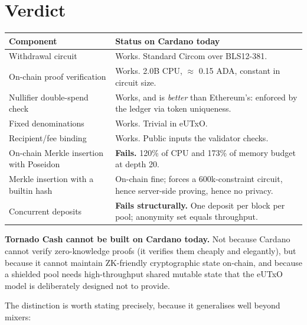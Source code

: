 \section{Verdict} \label{sec:ch8-verdict}

\begin{center}
\begin{tabular}{lp{6.9cm}}
  \hline
  \textbf{Component} & \textbf{Status on Cardano today} \\
  \hline
  Withdrawal circuit
    & Works. Standard Circom over BLS12-381. \\
  \addlinespace
  On-chain proof verification
    & Works. 2.0B CPU, $\approx$ 0.15 ADA, constant in circuit size. \\
  \addlinespace
  Nullifier double-spend check
    & Works, and is \emph{better} than Ethereum's: enforced by the ledger
      via token uniqueness. \\
  \addlinespace
  Fixed denominations
    & Works. Trivial in eUTxO. \\
  \addlinespace
  Recipient/fee binding
    & Works. Public inputs the validator checks. \\
  \hline
  \addlinespace
  On-chain Merkle insertion with Poseidon
    & \textbf{Fails.} 120\% of CPU and 173\% of memory budget at depth 20. \\
  \addlinespace
  Merkle insertion with a builtin hash
    & On-chain fine; forces a 600k-constraint circuit, hence server-side
      proving, hence no privacy. \\
  \addlinespace
  Concurrent deposits
    & \textbf{Fails structurally.} One deposit per block per pool; anonymity
      set equals throughput. \\
  \hline
\end{tabular}
\end{center}

\begin{highlight}
\textbf{Tornado Cash cannot be built on Cardano today.} Not because Cardano
cannot verify zero-knowledge proofs (it verifies them cheaply and elegantly),
but because it cannot maintain ZK-friendly cryptographic state on-chain, and
because a shielded pool needs high-throughput shared mutable state that the
eUTxO model is deliberately designed not to provide.
\end{highlight}

The distinction is worth stating precisely, because it generalises well beyond
mixers:

